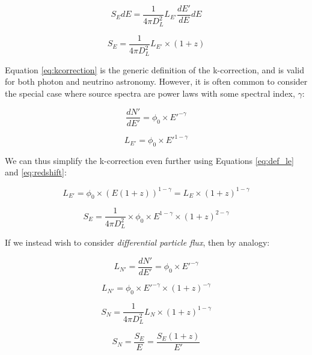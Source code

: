 \begin{equation}
 S_{E} dE = \frac{1}{4 \pi D_{L}^{2}}  L_{E'} \frac{dE'}{dE}  dE
\end{equation}

\begin{equation}
S_{E} = \frac{1}{4 \pi D_{L}^{2}} L_{E'} \times (1+z)
\label{eq:kcorrection}
\end{equation}

Equation \ref{eq:kcorrection} is the generic definition of the k-correction, and is valid for both photon and neutrino astronomy. However,  it is often common to consider the special case where source spectra are power laws with some spectral index, $\gamma$:

\begin{equation}
\frac{dN'}{dE'} = \phi_{0} \times E'^{-\gamma}
\label{eq:def_pl}
\end{equation}

\begin{equation}
L_{E'} = \phi_{0} \times E'^{1-\gamma}
\label{eq:def_le}
\end{equation}

We can thus simplify the k-correction even further using Equations \ref{eq:def_le} and \ref{eq:redshift}:

\begin{equation}
L_{E'} = \phi_{0} \times  (E(1+z))^{1-\gamma} = L_{E} \times (1+z)^{1-\gamma}
\end{equation}

\begin{equation}
S_{E} = \frac{1}{4 \pi D_{L}^{2}} \times \phi_{0} \times E^{1 - \gamma} \times (1+z) ^{2-\gamma}
\end{equation}

If we instead wish to consider \emph{differential particle flux}, then by analogy:

\begin{equation}
L_{N'} = \frac{dN'}{dE'} = \phi_{0} \times E'^{-\gamma}
\end{equation}

\begin{equation}
L_{N'} = \phi_{0} \times E'^{-\gamma} \times (1+z)^{-\gamma}
\end{equation}

\begin{equation}
S_{N} = \frac{1}{4 \pi D_{L}^{2}} L_{N} \times (1+z) ^{1-\gamma}
\end{equation}

\begin{equation}
S_{N} = \frac{S_{E}}{E} = \frac{S_{E} (1+z)}{E'} 
\end{equation}

